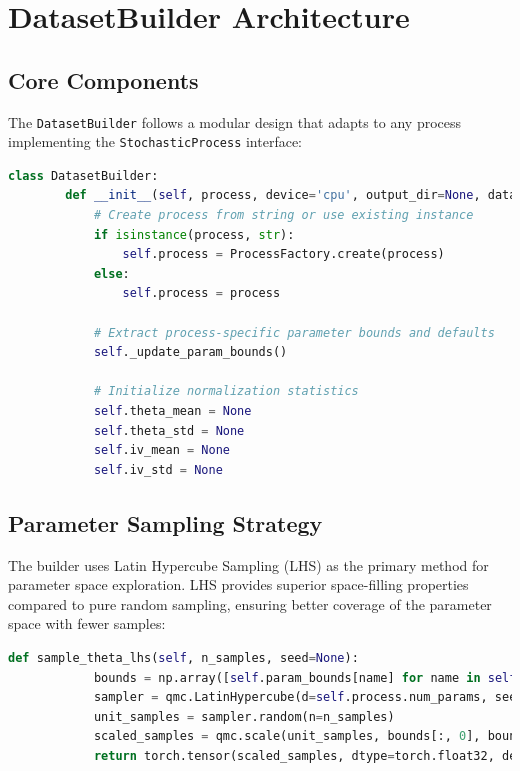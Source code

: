 	\section{DatasetBuilder Architecture}
	
	\subsection{Core Components}
	
	The \texttt{DatasetBuilder} follows a modular design that adapts to any process implementing the \texttt{StochasticProcess} interface:
	
	\begin{lstlisting}[language=Python, basicstyle=\ttfamily\footnotesize, 
		frame=single, rulecolor=\color{black!20}, backgroundcolor=\color{gray!5},
		showstringspaces=false, breaklines=true, columns=fullflexible]
		class DatasetBuilder:
		def __init__(self, process, device='cpu', output_dir=None, dataset_type='train'):
			# Create process from string or use existing instance
			if isinstance(process, str):
				self.process = ProcessFactory.create(process)
			else:
				self.process = process
		
			# Extract process-specific parameter bounds and defaults
			self._update_param_bounds()
		
			# Initialize normalization statistics
			self.theta_mean = None
			self.theta_std = None
			self.iv_mean = None
			self.iv_std = None
	\end{lstlisting}
	
	\subsection{Parameter Sampling Strategy}\label{subsec:param_sampling}
	
	The builder uses Latin Hypercube Sampling (LHS) as the primary method for parameter space exploration. LHS provides superior space-filling properties compared to pure random sampling, ensuring better coverage of the parameter space with fewer samples:
	
	\begin{lstlisting}[language=Python, basicstyle=\ttfamily\footnotesize, 
		frame=single, rulecolor=\color{black!20}, backgroundcolor=\color{gray!5},
		showstringspaces=false, breaklines=true, columns=fullflexible]
		def sample_theta_lhs(self, n_samples, seed=None):
		    bounds = np.array([self.param_bounds[name] for name in self.param_names])
		    sampler = qmc.LatinHypercube(d=self.process.num_params, seed=seed)
		    unit_samples = sampler.random(n=n_samples)
		    scaled_samples = qmc.scale(unit_samples, bounds[:, 0], bounds[:, 1])
		    return torch.tensor(scaled_samples, dtype=torch.float32, device=self.device)
	\end{lstlisting}

